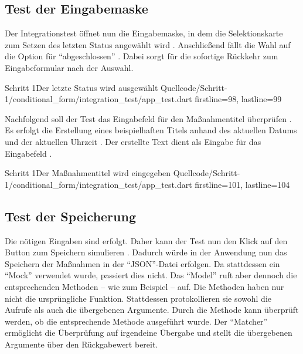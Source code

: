 \clearpage

\subsection{Test der Eingabemaske}
\label{sec:TestDerEingabemaske}

Der Integrationstest öffnet nun die Eingabemaske, in dem die Selektionskarte zum Setzen des letzten Status angewählt wird .
Anschließend fällt die Wahl auf die Option für \enquote{abgeschlossen} .
Dabei sorgt  für die sofortige Rückkehr zum Eingabeformular nach der Auswahl.
 
\begin{alexlisting}{Schritt 1}{Der letzte Status wird ausgewählt}
  {Quellcode/Schritt-1/conditional_form/integration_test/app_test.dart}
  {firstline=98, lastline=99}
  \label{lst:Schritt1LetzterStatusWirdAusgewählt}
\end{alexlisting}





Nachfolgend soll der Test das Eingabefeld für den Maßnahmentitel überprüfen \Lst{\ref{lst:Schritt1MassnahmentitelWirdEingegeben}}.
Es erfolgt die Erstellung eines beispielhaften Titels anhand des aktuellen Datums und der aktuellen Uhrzeit .
Der erstellte Text dient als Eingabe für das Eingabefeld . 

\begin{alexlisting}{Schritt 1}{Der Maßnahmentitel wird eingegeben}
  {Quellcode/Schritt-1/conditional_form/integration_test/app_test.dart}
  {firstline=101, lastline=104}
  \label{lst:Schritt1MassnahmentitelWirdEingegeben}
\end{alexlisting}

\subsection{Test der Speicherung}
\label{sec:TestDerSpeicherung}

Die nötigen Eingaben sind erfolgt.
Daher kann der Test nun den Klick auf den Button zum Speichern simulieren .
Dadurch würde in der Anwendung nun das Speichern der Maßnahmen in der \enquote{JSON}-Datei erfolgen.
Da stattdessen ein \enquote{Mock} verwendet wurde, passiert dies nicht.
Das \enquote{Model} ruft aber dennoch die entsprechenden Methoden -- wie zum Beispiel  -- auf.
Die Methoden haben nur nicht die ursprüngliche Funktion.
Stattdessen protokollieren sie sowohl die Aufrufe als auch die übergebenen Argumente.
Durch die Methode   kann überprüft werden, ob die entsprechende Methode  ausgeführt wurde.
Der \enquote{Matcher}  ermöglicht die Überprüfung auf irgendeine Übergabe und stellt die übergebenen Argumente über den Rückgabewert bereit.

